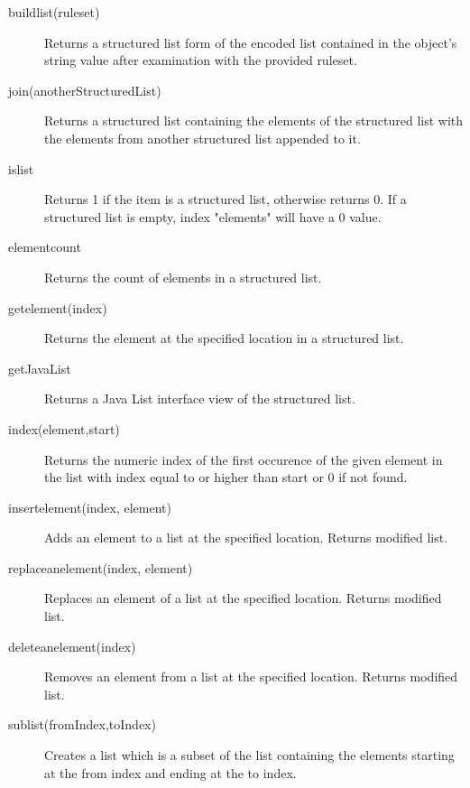 \begin{description}
\item[buildlist(ruleset)]

Returns a structured list form of the encoded list contained in the object's string value after examination with the provided ruleset.

\item[join(anotherStructuredList)]

Returns a structured list containing the elements of the structured list with the elements from another structured list appended to it.

\item[islist]

Returns 1 if the item is a structured list, otherwise returns 0. If a structured list is empty, index "elements" will have a 0 value. 

\item[elementcount]

Returns the count of elements in a structured list.
    
\item[getelement(index)]

Returns the element at the specified location in a structured list.

\item[getJavaList]

Returns a Java List interface view of the structured list. 

\item[index(element,start)]

Returns the numeric index of the first occurence of the given element in the list with index equal to or higher than start or 0 if not found.

\item[insertelement(index, element)]

Adds an element to a list at the specified location. Returns modified list.

\item[replaceanelement(index, element)]

Replaces an element of a list at the specified location. Returns modified list.


\item[deleteanelement(index)]

Removes an element from a list at the specified location. Returns modified list.

\item[sublist(fromIndex,toIndex)]

Creates a list which is a subset of the list containing the elements starting at the from index and ending at the to index. 
\end{description}

